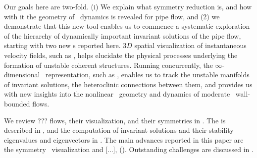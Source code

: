 Our goals here are two-fold.
(i) We explain what symmetry reduction is, and how with it the geometry
of \statesp\ dynamics is revealed for pipe flow, and
(2) we demonstrate that this new tool enables us to commence a systematic
exploration of the hierarchy of dynamically important invariant solutions
of the pipe flow, starting with two new \rpo s reported here. $3D$
spatial visualization of instantaneous velocity fields,
such as , helps elucidate
the physical processes underlying the formation of unstable coherent
structures. Running concurrently, the $\infty$-dimensional \stateDsp\
representation, such as ,
enables us to track the unstable manifolds of invariant
solutions, the heteroclinic connections between them, and
{provides us with} new insights into the nonlinear \statesp\ geometry and
dynamics of moderate \Reynolds\ wall-bounded flows.

We review  ??? flows, their visualization,
and their symmetries in .
The {\mslices}  is described in ,
and the computation of invariant solutions and their stability
eigenvalues and eigenvectors in . The
main advances reported in this paper are the symmetry \reducedsp\
visualization and [...],
(\refsect{s:rpos}). Outstanding challenges are discussed in
\refsect{s:concl}.
